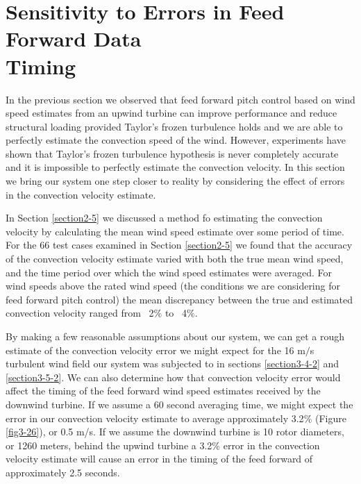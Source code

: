 
\section{Sensitivity to Errors in Feed Forward Data \\
		Timing}  \label{section3-6}
In the previous section we observed that feed forward pitch control based on wind speed estimates from an upwind turbine can improve performance and reduce structural loading provided Taylor's frozen turbulence holds and we are able to perfectly estimate the convection speed of the wind. However, experiments have shown that Taylor's frozen turbulence hypothesis is never completely accurate and it is impossible to perfectly estimate the convection velocity. In this section we bring our system one step closer to reality by considering the effect of errors in the convection velocity estimate.

In Section \ref{section2-5} we discussed a method fo estimating the convection velocity by calculating the mean wind speed estimate over some period of time. For the 66 test cases examined in Section \ref{section2-5} we found that the accuracy of the convection velocity estimate varied with both the true mean wind speed, and the time period over which the wind speed estimates were averaged. For wind speeds above the rated wind speed (the conditions we are considering for feed forward pitch control) the mean discrepancy between the true and estimated convection velocity ranged from ~2$\%$ to ~4$\%$.

By making a few reasonable assumptions about our system, we can get a rough estimate of the convection velocity error we might expect for the 16 m$/$s turbulent wind field our system was subjected to in sections \ref{section3-4-2} and \ref{section3-5-2}. We can also determine how that convection velocity error would affect the timing of the feed forward wind speed estimates received by the downwind turbine. If we assume a 60 second averaging time, we might expect the error in our convection velocity estimate to average approximately 3.2$\%$ (Figure \ref{fig3-26}), or 0.5 m/s. If we assume the downwind turbine is 10 rotor diameters, or 1260 meters, behind the upwind turbine a 3.2$\%$ error in the convection velocity estimate will cause an error in the timing of the feed forward of approximately 2.5 seconds.

